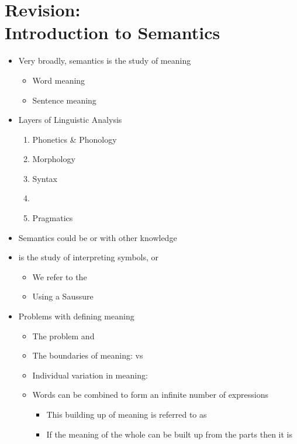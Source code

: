 \documentclass[headrule,footrule]{foils}
\begin{document}
\section{Revision: \\ Introduction to Semantics}

\begin{itemize}
\item Very broadly, semantics is the study of meaning
  \begin{itemize}
  \item Word meaning
  \item Sentence meaning
  \end{itemize}
\item Layers of Linguistic Analysis
  \begin{enumerate}%
  \item Phonetics \& Phonology
  \item Morphology
  \item Syntax
  \item {}
  \item Pragmatics
  \end{enumerate}
\item Semantics could be  or  with other knowledge
\end{itemize}


\begin{itemize}
\item {} is the study of interpreting symbols, or 
  \begin{itemize}
  \item We refer to the 
  \item Using a \hfill Saussure
  \end{itemize}
\item Problems with defining meaning
  \begin{itemize}
  \item The  problem and 
  \item The boundaries of meaning:  vs 
  \item Individual variation in meaning: 
  \item Words can be combined to form an infinite number of expressions
    \begin{itemize}
    \item This building up of meaning is referred to as 
    \item If the meaning of the whole can be built up from the parts then it is 
  \end{itemize}
\end{itemize}
\end{itemize}
\end{document}
